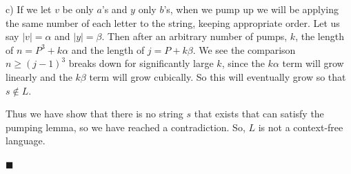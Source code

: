 \documentclass[11pt]{article}
\begin{document}
c) If we let $v$ be only $a$'s and $y$ only $b$'s, when we pump up we will be applying the same number of each letter to the string, keeping appropriate order. Let us say $|v| = \alpha$ and $|y| = \beta$. Then after an arbitrary number of pumps, $k$, the length of $n = P^3+ k\alpha$ and the length of $j = P +k \beta$. We see the comparison $n \geq (j-1)^3$ breaks down for significantly large $k$, since the $k\alpha$ term will grow linearly and the $k\beta$ term will grow cubically. So  this will eventually grow so that $s \notin L$. 

Thus we have show that there is no string $s$ that exists that can satisfy the pumping lemma, so we have reached a contradiction. So, $L$ is not a context-free language. 

\begin{flushright}$\blacksquare$\end{flushright}
\end{document}
